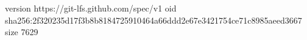 version https://git-lfs.github.com/spec/v1
oid sha256:2f320235d17f3b8b8184725910464a66ddd2e67e3421754ce71c8985aeed3667
size 7629
